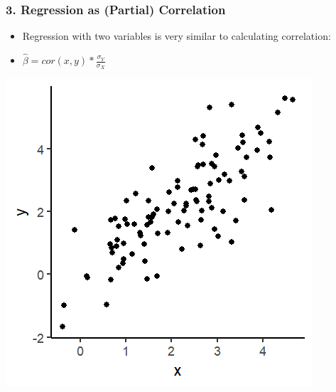 \documentclass[xcolor=x11names,compress]{beamer}\usepackage[]{graphicx}\usepackage[]{color}
\makeatletter
\def\maxwidth{ %
  \ifdim\Gin@nat@width>\linewidth
    \linewidth
  \else
    \Gin@nat@width
  \fi
}
\newenvironment{knitrout}{}{} %
\renewcommand{\(}{\begin{columns}}
\renewcommand{\)}{\end{columns}}
\newcommand{\<}[1]{\begin{column}{#1}}
\renewcommand{\>}{\end{column}}
\makeatother
\begin{document}
\begin{frame}
\frametitle{3. Regression as (Partial) Correlation}
\begin{itemize}
\item Regression with two variables is very similar to calculating correlation:
\pause
\item $\hat{\beta}=cor(x,y) * \frac{\sigma_Y}{\sigma_X}$
\pause
\end{itemize}
\begin{multicols}{2}
\begin{knitrout}
\color{fgcolor}
\includegraphics[width=\maxwidth]{figure/corr_regn_fig1-1} 

\end{knitrout}
\columnbreak
\end{multicols}
\end{frame}
\end{document}
